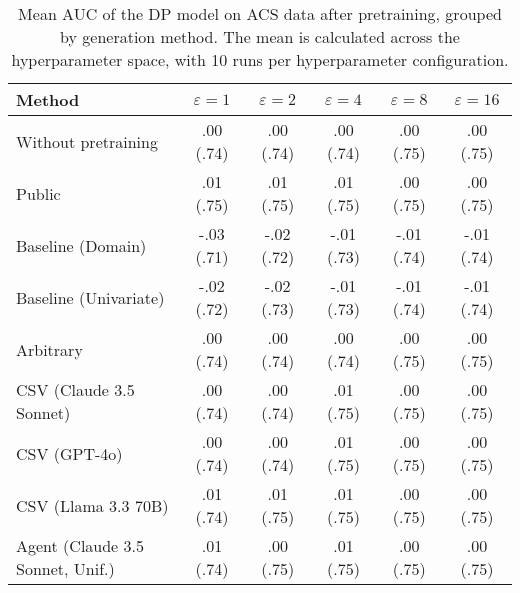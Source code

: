 \begin{table}[h!]
    \centering
    \caption{Mean AUC of the DP model on ACS data after pretraining, grouped by generation method. The mean is calculated across the hyperparameter space, with 10 runs per hyperparameter configuration.}
    \label{tab:epsilon_comparison}
    \begin{tabular}{lccccc}
    \toprule
    Method & $\varepsilon=1$ & $\varepsilon=2$ & $\varepsilon=4$ & $\varepsilon=8$ & $\varepsilon=16$ \\
    \midrule
    Without pretraining & .00 {\small (.74)} & .00 {\small (.74)} & .00 {\small (.74)} & .00 {\small (.75)} & .00 {\small (.75)} \\
    \arrayrulecolor{black!50!}\midrule
    Public & \cellcolor{gold!30}.01 {\small (.75)} & \cellcolor{gold!30}.01 {\small (.75)} & \cellcolor{gold!30}.01 {\small (.75)} & \cellcolor{silver!30}.00 {\small (.75)} & \cellcolor{gold!30}.00 {\small (.75)} \\
    \arrayrulecolor{black!50!}\midrule
    Baseline (Domain) & -.03 {\small (.71)} & -.02 {\small (.72)} & -.01 {\small (.73)} & -.01 {\small (.74)} & -.01 {\small (.74)} \\
    Baseline (Univariate) & -.02 {\small (.72)} & -.02 {\small (.73)} & -.01 {\small (.73)} & -.01 {\small (.74)} & -.01 {\small (.74)} \\
    \arrayrulecolor{black!50!}\midrule
    Arbitrary & .00 {\small (.74)} & .00 {\small (.74)} & .00 {\small (.74)} & .00 {\small (.75)} & .00 {\small (.75)} \\
    \arrayrulecolor{black!50!}\midrule
    CSV (Claude 3.5 Sonnet) & .00 {\small (.74)} & .00 {\small (.74)} & \cellcolor{bronze!30}.01 {\small (.75)} & \cellcolor{gold!30}.00 {\small (.75)} & \cellcolor{gold!30}.00 {\small (.75)} \\
    CSV (GPT-4o) & .00 {\small (.74)} & \cellcolor{bronze!30}.00 {\small (.74)} & \cellcolor{bronze!30}.01 {\small (.75)} & \cellcolor{gold!30}.00 {\small (.75)} & \cellcolor{gold!30}.00 {\small (.75)} \\
    CSV (Llama 3.3 70B) & \cellcolor{gold!30}.01 {\small (.74)} & \cellcolor{silver!30}.01 {\small (.75)} & \cellcolor{silver!30}.01 {\small (.75)} & \cellcolor{gold!30}.00 {\small (.75)} & \cellcolor{gold!30}.00 {\small (.75)} \\
    \arrayrulecolor{black!50!}\midrule
    Agent (Claude 3.5 Sonnet, Unif.) & \cellcolor{silver!30}.01 {\small (.74)} & \cellcolor{bronze!30}.00 {\small (.75)} & \cellcolor{bronze!30}.01 {\small (.75)} & \cellcolor{bronze!30}.00 {\small (.75)} & \cellcolor{silver!30}.00 {\small (.75)} \\

\end{tabular}
\end{table}
